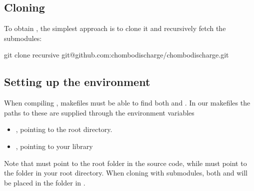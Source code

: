 \documentclass[letterpaper,10pt,english]{sphinxmanual}
\begin{document}
\subsection{Cloning }
\label{\detokenize{Base/Installation:cloning-chombo-discharge}}
\sphinxAtStartPar
To obtain , the simplest approach is to clone it and recursively fetch the submodules:

\begin{sphinxVerbatim}[commandchars=\\\{\},formatcom=\scriptsize]
git clone \PYGZhy{}\PYGZhy{}recursive git@github.com:chombo\PYGZhy{}discharge/chombo\PYGZhy{}discharge.git
\end{sphinxVerbatim}


\subsection{Setting up the environment}
\label{\detokenize{Base/Installation:setting-up-the-environment}}
\sphinxAtStartPar
When compiling , makefiles must be able to find both  and .
In our makefiles the paths to these are supplied through the environment variables
\begin{itemize}
\item {} 
\sphinxAtStartPar
{}, pointing to the  root directory.

\item {} 
\sphinxAtStartPar
{}, pointing to your  library

\end{itemize}

\sphinxAtStartPar
Note that  must point to the root folder in the  source code, while  must point to the  folder in your  root directory.
When cloning with submodules, both  and  will be placed in the  folder in .
\end{document}

